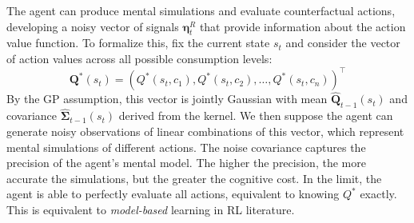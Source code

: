 The agent can produce mental simulations and evaluate counterfactual actions, developing a 
noisy vector of signals $\boldsymbol{\eta}^R_t$ that provide information about the 
action value function. To formalize this, fix the current state $s_t$ and consider 
the vector of action values across all possible consumption levels:
\begin{equation}
    \boldsymbol{Q}^*(s_t) = (Q^*(s_t, c_1), Q^*(s_t, c_2), \ldots, Q^*(s_t, c_n))^\top
\end{equation}
By the GP assumption, this vector is jointly Gaussian with mean 
$\hat{\boldsymbol{Q}}_{t-1}(s_t)$ and covariance $\hat{\boldsymbol{\Sigma}}_{t-1}(s_t)$ 
derived from the kernel. We then suppose the agent can generate noisy observations of
linear combinations of this vector, which represent mental simulations of different actions.
The noise covariance captures the precision of the agent's mental model. The higher the precision,
the more accurate the simulations, but the greater the cognitive cost. In the limit,
the agent is able to perfectly evaluate all actions, equivalent to knowing $Q^*$ exactly.
This is equivalent to \textit{model-based} learning in RL literature.


